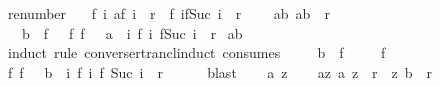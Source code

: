 \begin{isabellebody}
\isanewline
\isanewline
{}\isamarkupfalse%
\ renumber{\isacharprime}{\isacharcolon}\isanewline
\ \ \ f{\isacharcolon}\ {\isachardoublequoteopen}{\isasymforall}i{\isachardot}\ {\isacharparenleft}a{\isacharcomma}f\ i{\isacharparenright}\ {\isasymin}\ r\isactrlsup {\isacharasterisk}\ {\isasymand}\ {\isacharparenleft}f\ i{\isacharcomma}f{\isacharparenleft}Suc\ i{\isacharparenright}{\isacharparenright}\ {\isasymin}\ r{\isachardoublequoteclose}\ \isanewline
\ \ \ a{\isacharunderscore}b{\isacharcolon}\ {\isachardoublequoteopen}{\isacharparenleft}a{\isacharcomma}b{\isacharparenright}\ {\isasymin}\ r\isactrlsup {\isacharasterisk}{\isachardoublequoteclose}\ \isanewline
\ \ \ {\isachardoublequoteopen}b\ {\isacharequal}\ f\ {}\ {\isasymLongrightarrow}\ {\isacharparenleft}{\isasymexists}f{\isachardot}\ f\ {}\ {\isacharequal}\ a\ {\isasymand}\ {\isacharparenleft}{\isasymforall}i{\isachardot}\ {\isacharparenleft}f\ i{\isacharcomma}\ f{\isacharparenleft}Suc\ i{\isacharparenright}{\isacharparenright}\ {\isasymin}\ r{\isacharparenright}{\isacharparenright}{\isachardoublequoteclose}\isanewline
%
\isadelimproof
%
\endisadelimproof
%
\isatagproof
{}\isamarkupfalse%
\ a{\isacharunderscore}b\isanewline
{}\isamarkupfalse%
\ {\isacharparenleft}induct\ rule{\isacharcolon}\ converse{\isacharunderscore}rtrancl{\isacharunderscore}induct\ {\isacharbrackleft}consumes\ {}{\isacharbrackright}{\isacharparenright}\isanewline
\ \ \isamarkupfalse%
\ {\isachardoublequoteopen}b\ {\isacharequal}\ f\ {}{\isachardoublequoteclose}\isanewline
\ \ \isamarkupfalse%
\ f\ \isamarkupfalse%
\ {\isachardoublequoteopen}{\isasymexists}f{\isachardot}\ f\ {}\ {\isacharequal}\ b\ {\isasymand}\ {\isacharparenleft}{\isasymforall}i{\isachardot}\ {\isacharparenleft}f\ i{\isacharcomma}\ f\ {\isacharparenleft}Suc\ i{\isacharparenright}{\isacharparenright}\ {\isasymin}\ r{\isacharparenright}{\isachardoublequoteclose}\isanewline
\ \ \ \ \isamarkupfalse%
\ blast\isanewline
{}\isamarkupfalse%
\isanewline
\ \ \isamarkupfalse%
\ a\ z\isanewline
\ \ \isamarkupfalse%
\ a{\isacharunderscore}z{\isacharcolon}\ {\isachardoublequoteopen}{\isacharparenleft}a{\isacharcomma}\ z{\isacharparenright}\ {\isasymin}\ r{\isachardoublequoteclose}\ \ {\isachardoublequoteopen}{\isacharparenleft}z{\isacharcomma}\ b{\isacharparenright}\ {\isasymin}\ r\isactrlsup {\isacharasterisk}{\isachardoublequoteclose}\ \isanewline

\end{isabellebody}
